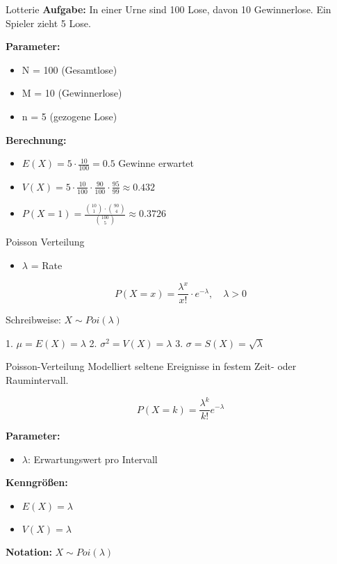 \begin{example}{Lotterie}
\textbf{Aufgabe:} In einer Urne sind 100 Lose, davon 10 Gewinnerlose. Ein Spieler zieht 5 Lose.

\textbf{Parameter:}
\begin{itemize}
\item N = 100 (Gesamtlose)
\item M = 10 (Gewinnerlose)
\item n = 5 (gezogene Lose)
\end{itemize}

\textbf{Berechnung:}
\begin{itemize}
\item $E(X) = 5 \cdot \frac{10}{100} = 0.5$ Gewinne erwartet
\item $V(X) = 5 \cdot \frac{10}{100} \cdot \frac{90}{100} \cdot \frac{95}{99} \approx 0.432$
\item $P(X=1) = \frac{\binom{10}{1} \cdot \binom{90}{4}}{\binom{100}{5}} \approx 0.3726$
\end{itemize}
\end{example}

\begin{definition}{Poisson Verteilung}
\begin{itemize}
  \item $\lambda$ = Rate
\end{itemize}

$$P(X=x) = \frac{\lambda^x}{x!} \cdot e^{-\lambda}, \quad \lambda > 0$$

Schreibweise: $X \sim Poi(\lambda)$

1. $\mu = E(X) = \lambda$
2. $\sigma^2 = V(X) = \lambda$
3. $\sigma = S(X) = \sqrt{\lambda}$
\end{definition}

\begin{definition}{Poisson-Verteilung}
Modelliert seltene Ereignisse in festem Zeit- oder Raumintervall.

$$P(X=k) = \frac{\lambda^k}{k!}e^{-\lambda}$$

\textbf{Parameter:}
\begin{itemize}
    \item $\lambda$: Erwartungswert pro Intervall
\end{itemize}

\textbf{Kenngrößen:}
\begin{itemize}
    \item $E(X) = \lambda$
    \item $V(X) = \lambda$
\end{itemize}

\textbf{Notation:} $X \sim Poi(\lambda)$
\end{definition}

